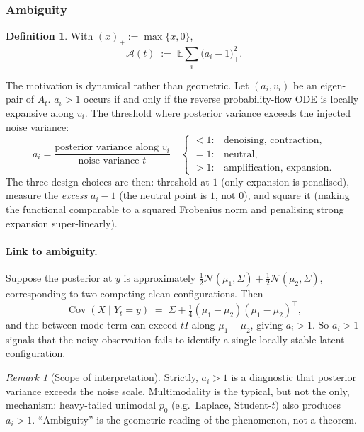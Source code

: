 \documentclass{article}
\DeclareMathOperator{\Cov}{Cov}
\newcommand{\E}{\mathbb{E}}
\newcommand{\N}{\mathcal{N}}
\newcommand{\amb}{\mathcal{A}}
\theoremstyle{plain}
\theoremstyle{definition}
\newtheorem{definition}[theorem]{Definition}
\theoremstyle{remark}
\newtheorem{remark}[theorem]{Remark}
\begin{document}
\subsubsection{Ambiguity}

\begin{definition}
With $(x)_+ := \max\{x,0\}$,
\begin{equation}
\amb(t) \;:=\; \E\sum_i \bigl(a_i - 1\bigr)_+^2 .
\label{eq:amb}
\end{equation}
\end{definition}

The motivation is dynamical rather than geometric. Let $(a_i, v_i)$ be an eigen-pair of $A_t$. $a_i > 1$ occurs if and only if the reverse probability-flow ODE is locally expansive along $v_i$. The threshold where posterior variance exceeds the injected noise variance:
\begin{equation}
a_i = \frac{\text{posterior variance along } v_i}{\text{noise variance } t}
\quad\begin{cases}
<1: & \text{denoising, contraction},\\
=1: & \text{neutral},\\
>1: & \text{amplification, expansion}.
\end{cases}
\end{equation}
The three design choices are then: threshold at $1$ (only expansion is
penalised), measure the \emph{excess} $a_i-1$ (the neutral point is $1$,
not $0$), and square it (making the functional comparable to a squared
Frobenius norm and penalising strong expansion super-linearly).

\paragraph{Link to ambiguity.}
Suppose the posterior at $y$ is approximately
$\tfrac12\N(\mu_1,\Sigma) + \tfrac12\N(\mu_2,\Sigma)$, corresponding to
two competing clean configurations. Then
\begin{equation}
\Cov(X\mid Y_t=y) \;=\; \Sigma + \tfrac14(\mu_1-\mu_2)(\mu_1-\mu_2)^\top ,
\end{equation}
and the between-mode term can exceed $tI$ along $\mu_1-\mu_2$, giving
$a_i>1$. So $a_i > 1$ signals that the noisy observation fails to
identify a single locally stable latent configuration.

\begin{remark}[Scope of interpretation]
Strictly, $a_i>1$ is a diagnostic that posterior variance exceeds the
noise scale. Multimodality is the typical, but not the only, mechanism:
heavy-tailed unimodal $p_0$ (e.g.\ Laplace, Student-$t$) also produces
$a_i>1$. ``Ambiguity'' is the geometric reading of the phenomenon, not a
theorem.
\end{remark}
\end{document}
